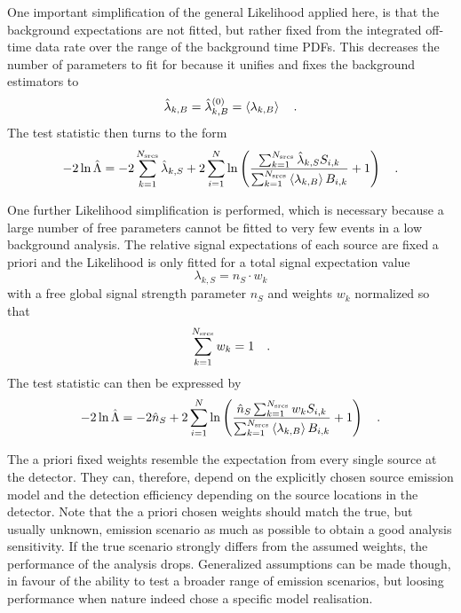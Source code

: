 One important simplification of the general Likelihood applied here, is that the background expectations are not fitted, but rather fixed from the integrated off-time data rate over the range of the background time PDFs.
This decreases the number of parameters to fit for because it unifies and fixes the background estimators to
\begin{equation}
  \hat{\lambda}_{k,B} = \hat{\lambda}_{k,B}^{(0)} = \Braket{\lambda_{k,B}}
  \quad\text{.}
\end{equation}
The test statistic then turns to the form
\begin{equation}
  -2\ln\hat{\Lambda}
  = -2\sum_{k=1}^{N_\text{srcs}}\hat{\lambda}_{k,S} +
      2\sum_{i=1}^N \ln\left(
        \frac{\sum_{k=1}^{N_\text{srcs}}\hat{\lambda}_{k,S} S_{i,k}}
             {\sum_{k=1}^{N_\text{srcs}}\Braket{\lambda_{k,B}} B_{i,k}}
        + 1
      \right)
  \quad\text{.}
\end{equation}

One further Likelihood simplification is performed, which is necessary because a large number of free parameters cannot be fitted to very few events in a low background analysis.
The relative signal expectations of each source are fixed a priori and the Likelihood is only fitted for a total signal expectation value
\begin{equation}
  \label{equ:ns_split_weights_per_src}
  \lambda_{k,S} = n_S \cdot w_k
\end{equation}
with a free global signal strength parameter $n_S$ and weights $w_k$ normalized so that
\begin{equation}
  \sum_{k=1}^{N_\text{srcs}} w_k = 1
  \quad\text{.}
\end{equation}
The test statistic can then be expressed by
\begin{equation}
  \label{equ:tdep_ts_general}
  -2\ln\hat{\Lambda}
  = -2\hat{n}_S +
      2\sum_{i=1}^N \ln\left(
        \frac{\hat{n}_S \sum_{k=1}^{N_\text{srcs}} w_k S_{i,k}}
             {\sum_{k=1}^{N_\text{srcs}}\Braket{\lambda_{k,B}} B_{i,k}}
        + 1
      \right)
  \quad\text{.}
\end{equation}

The a priori fixed weights resemble the expectation from every single source at the detector.
They can, therefore, depend on the explicitly chosen source emission model and the detection efficiency depending on the source locations in the detector.
Note that the a priori chosen weights should match the true, but usually unknown, emission scenario as much as possible to obtain a good analysis sensitivity.
If the true scenario strongly differs from the assumed weights, the performance of the analysis drops.
Generalized assumptions can be made though, in favour of the ability to test a broader range of emission scenarios, but loosing performance when nature indeed chose a specific model realisation.


